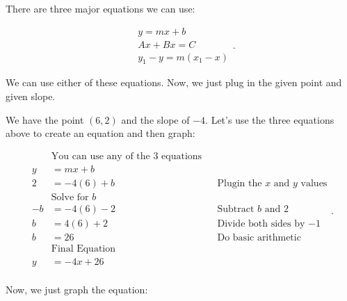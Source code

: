 \label{les_4_unit_1:graph_line_through_given_point_with_slope}

There are three major equations we can use:

\begin{equation}
  \label{eqt:three_major_equations}
  \begin{split}
    &y = mx + b \\
    &Ax + Bx = C \\
    &y_1 - y = m(x_1 - x)
  \end{split}
.\end{equation}

We can use either of these equations. Now, we just plug in the given point and
given slope.

\begin{example}
  \label{exm:graph_line_through_given_point_with_slope}

  We have the point $(6, 2)$ and the slope of $-4$. Let's use the three
  equations above to create an equation and then graph:

  \begin{equation}
    \label{edt:y_mx_b_form}
    \begin{alignedat}{3}
      &\textrm{You can use any of the $3$ equations} \\
      y &= mx + b \\
      2 &= -4(6) + b \qquad\qquad && \textrm{Plugin the $x$ and $y$ values} \\
        & \textrm{Solve for $b$} \\
      -b &= -4(6) - 2 \qquad\qquad && \textrm{Subtract $b$ and $2$} \\
      b &= 4(6) + 2 \qquad\qquad && \textrm{Divide both sides by $-1$} \\
      b &= 26 \qquad\qquad && \textrm{Do basic arithmetic} \\
        & \textrm{Final Equation} \\
      y &= -4x + 26 \\
    \end{alignedat}
  .\end{equation}
\end{example}

Now, we just graph the equation:

\begin{figure}[htpb]
  \centering
  \label{fig:graph_line_through_given_point_with_slope}
\end{figure}

\newpage
